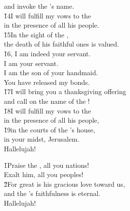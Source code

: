 \begin{poetry}
\poemll    and invoke the 's name. \\
\poeml \v{14}I will fulfill my vows to the  \\
\poemll    in the presence of all his people. \\
\poeml \v{15}In the sight of the , \\
\poemll    the death of his faithful ones is valued. \\
\poeml \v{16}, I am indeed your servant. \\
\poemll    I am your servant. \\
\poeml I am the son of your handmaid. \\
\poemll    You have released my bonds. \\
\poeml \v{17}I will bring you a thanksgiving offering \\
\poemll    and call on the name of the ! \\
\poeml \v{18}I will fulfill my vows to the  \\
\poemll    in the presence of all his people, \\
\poeml \v{19}in the courts of the 's house, \\
\poemll    in your midst, Jerusalem. \\
\poeml Hallelujah!
\end{poetry}

\begin{poetry}
\poeml \v{1}Praise the , all you nations! \\
\poemll    Exalt him, all you peoples! \\
\poeml \v{2}For great is his gracious love toward us, \\
\poemll    and the 's faithfulness is eternal. \\
\poeml Hallelujah!
\end{poetry}


